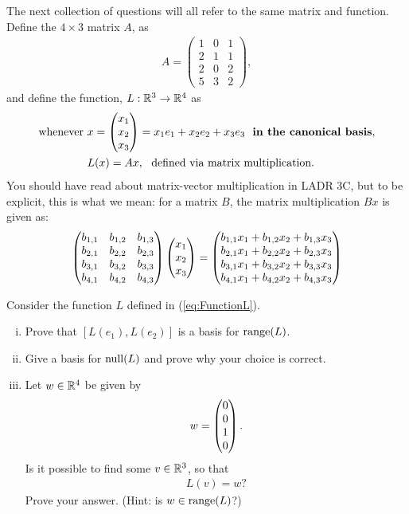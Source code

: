 \noindent The next collection of questions will all refer to the same matrix and function. Define the $4\times3$ matrix $A$, as
	\begin{align}\label{eq:MatrixA}
		A = 
		 \begin{pmatrix}
		  1 & 0 & 1 \\
		  2 & 1 & 1 \\
		  2 & 0 & 2 \\
		  5 & 3 & 2 
		 \end{pmatrix},
	\end{align}
	and define the function, $L:{\mathbb R}^3\to{\mathbb R}^4$ as
	\begin{align}\label{eq:FunctionL}
		\text{whenever}\ &x = \begin{pmatrix} x_1\\ x_2\\ x_3\end{pmatrix} = x_1 e_1 + x_2 e_2 + x_3 e_3\ \ \text{\textbf{in the canonical basis}},\nonumber \\
		&L(x) = Ax,\ \ \text{defined via matrix multiplication}.
	\end{align}
	You should have read about matrix-vector multiplication in LADR 3C, but to be explicit, this is what we mean: for a matrix $B$, the matrix multiplication $Bx$ is given as:
	\begin{align*}
		\begin{pmatrix}
	     	  b_{1,1} & b_{1,2} & b_{1,3} \\
	     	  b_{2,1} & b_{2,2} & b_{2,3} \\
	     	  b_{3,1} & b_{3,2} & b_{3,3} \\
	     	  b_{4,1} & b_{4,2} & b_{4,3} \\
		\end{pmatrix}
		\begin{pmatrix}
			x_1\\
			x_2\\
			x_3
		\end{pmatrix}
		= 
		\begin{pmatrix} b_{1,1}x_1 + b_{1,2}x_2 + b_{1,3}x_3\\ b_{2,1}x_1 + b_{2,2}x_2 + b_{2,3}x_3\\b_{3,1}x_1 + b_{3,2}x_2 + b_{3,3}x_3 \\ b_{4,1}x_1 + b_{4,2}x_2 + b_{4,3}x_3\end{pmatrix}
	\end{align*}
	
\begin{question}\label{que:RangeAndNullMatrixL}
	\normalfont
	
	Consider the function $L$ defined in (\ref{eq:FunctionL}).
	
	\begin{enumerate}[(i)]
		\item Prove that $[L(e_1), L(e_2)]$ is a basis for $\textnormal{range}(L)$.
		
		\item Give a basis for $\textnormal{null}(L)$ and prove why your choice is correct.
		
		\item Let $w\in{\mathbb R}^4$ be given by
		\begin{align*}
			w = \begin{pmatrix} 0\\ 0\\1 \\ 0\end{pmatrix}.
		\end{align*}
		Is it possible to find some $v\in{\mathbb R}^3$, so that
		\begin{align*}
			L(v)=w?
		\end{align*}
		Prove your answer. (Hint: is $w\in\textnormal{range}(L)$?)
	\end{enumerate}
\end{question}

